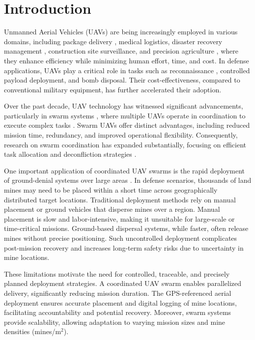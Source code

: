 \documentclass[subscriptcorrection,upint,nolists, varvw,barcolor=Goldenrod3,mathalfa=cal=euler,balance,hyphenate,french]{asmejour} %
\begin{document}
\date{Version \versionno, \today}%

\maketitle

\section{Introduction}
Unmanned Aerial Vehicles (UAVs) are being increasingly employed in various domains, including package delivery \cite{Yang2023, Jin2023}, medical logistics, disaster recovery management \cite{Ijaz2023}, construction site surveillance, and precision agriculture \cite{Qu2022, Alzahrani2020}, where they enhance efficiency while minimizing human effort, time, and cost.
In defense applications, UAVs play a critical role in tasks such as reconnaissance \cite{Zhang2023}, controlled payload deployment, and bomb disposal. 
Their cost-effectiveness, compared to conventional military equipment, has further accelerated their adoption.

Over the past decade, UAV technology has witnessed significant advancements, particularly in swarm systems \cite{Javed2024, Munasinghe2024}, where multiple UAVs operate in coordination to execute complex tasks \cite{Qamar2022, Chen2024, Xia2020}. 
Swarm UAVs offer distinct advantages, including reduced mission time, redundancy, and improved operational flexibility. 
Consequently, research on swarm coordination has expanded substantially, focusing on efficient task allocation and deconfliction strategies \cite{Neville2023, Duan2021}.

One important application of coordinated UAV swarms is the rapid deployment of ground-denial systems over large areas \cite{Reddy2023, Yoo2021}. 
In defense scenarios, thousands of land mines may need to be placed within a short time across geographically distributed target locations. 
Traditional deployment methods rely on manual placement or ground vehicles that disperse mines over a region. Manual placement is slow and labor-intensive, making it unsuitable for large-scale or time-critical missions.
Ground-based dispersal systems, while faster, often release mines without precise positioning.
Such uncontrolled deployment complicates post-mission recovery and increases long-term safety risks due to uncertainty in mine locations.

These limitations motivate the need for controlled, traceable, and precisely planned deployment strategies. 
A coordinated UAV swarm enables parallelized delivery, significantly reducing mission duration. The GPS-referenced aerial deployment ensures accurate placement and digital logging of mine locations, facilitating accountability and potential recovery.
Moreover, swarm systems provide scalability, allowing adaptation to varying mission sizes and mine densities (mines/m$^2$).
\end{document}
